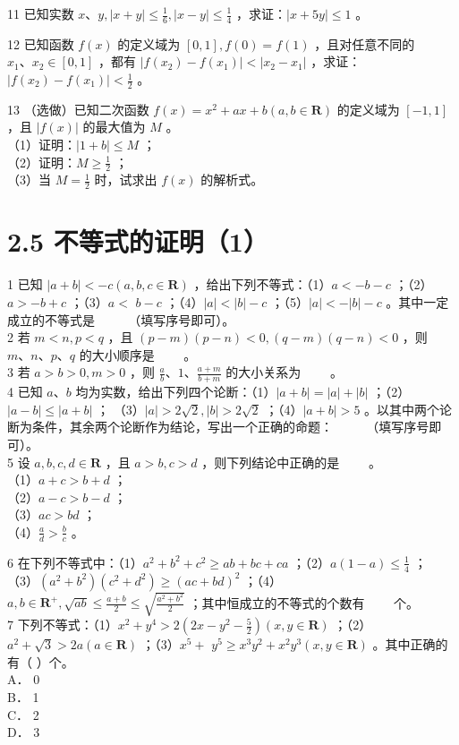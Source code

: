 \documentclass[10pt]{article}
\begin{document}
11 已知实数 \(x 、 y,|x+y| \leqslant \frac{1}{6},|x-y| \leqslant \frac{1}{4}\) ，求证：\(|x+5 y| \leqslant 1\) 。

12 已知函数 \(f(x)\) 的定义域为 \([0,1], f(0)=f(1)\) ，且对任意不同的 \(x_{1} 、 x_{2} \in[0,1]\) ，都有 \(\left|f\left(x_{2}\right)-f\left(x_{1}\right)\right|<\left|x_{2}-x_{1}\right|\) ，求证：\(\left|f\left(x_{2}\right)-f\left(x_{1}\right)\right|<\frac{1}{2}\) 。

13 （选做）已知二次函数 \(f(x)=x^{2}+a x+b(a, b \in \mathbf{R})\) 的定义域为 \([-1,1]\) ，且 \(|f(x)|\) 的最大值为 \(M\) 。\\
（1）证明：\(|1+b| \leqslant M\) ；\\
（2）证明：\(M \geqslant \frac{1}{2}\) ；\\
（3）当 \(M=\frac{1}{2}\) 时，试求出 \(f(x)\) 的解析式。

\section*{2.5 不等式的证明（1）}
1 已知 \(|a+b|<-c(a, b, c \in \mathbf{R})\) ，给出下列不等式：（1）\(a<-b-c\) ；（2）\(a>-b+c\) ；（3）\(a<\) \(b-c\) ；（4）\(|a|<|b|-c\) ；（5）\(|a|<-|b|-c\) 。其中一定成立的不等式是 \(\qquad\) （填写序号即可）。\\
2 若 \(m<n, p<q\) ，且 \((p-m)(p-n)<0,(q-m)(q-n)<0\) ，则 \(m 、 n 、 p 、 q\) 的大小顺序是 \(\qquad\)。\\
3 若 \(a>b>0, m>0\) ，则 \(\frac{a}{b} 、 1 、 \frac{a+m}{b+m}\) 的大小关系为 \(\qquad\)。\\
4 已知 \(a 、 b\) 均为实数，给出下列四个论断：（1）\(|a+b|=|a|+|b|\) ；（2）\(|a-b| \leqslant|a+b|\) ； （3）\(|a|>2 \sqrt{2},|b|>2 \sqrt{2}\) ；（4）\(|a+b|>5\) 。以其中两个论断为条件，其余两个论断作为结论，写出一个正确的命题： \(\qquad\) （填写序号即可）。\\
5 设 \(a, b, c, d \in \mathbf{R}\) ，且 \(a>b, c>d\) ，则下列结论中正确的是 \(\qquad\)。\\
（1）\(a+c>b+d\) ；\\
（2）\(a-c>b-d\) ；\\
（3）\(a c>b d\) ；\\
（4）\(\frac{a}{d}>\frac{b}{c}\) 。

6 在下列不等式中：（1）\(a^{2}+b^{2}+c^{2} \geqslant a b+b c+c a\) ；（2）\(a(1-a) \leqslant \frac{1}{4}\) ；\\
（3）\(\left(a^{2}+b^{2}\right)\left(c^{2}+d^{2}\right) \geqslant(a c+b d)^{2}\) ；（4）\(a, b \in \mathbf{R}^{+}, \sqrt{a b} \leqslant \frac{a+b}{2} \leqslant \sqrt{\frac{a^{2}+b^{2}}{2}}\) ；其中恒成立的不等式的个数有 \(\qquad\)个。\\
7 下列不等式：（1）\(x^{2}+y^{4}>2\left(2 x-y^{2}-\frac{5}{2}\right)(x, y \in \mathbf{R})\) ；（2）\(a^{2}+\sqrt{3}>2 a(a \in \mathbf{R})\) ；（3）\(x^{5}+\) \(y^{5} \geqslant x^{3} y^{2}+x^{2} y^{3}(x, y \in \mathbf{R})\) 。其中正确的有（ ）个。\\
A． 0\\
B． 1\\
C． 2\\
D． 3
\end{document}
